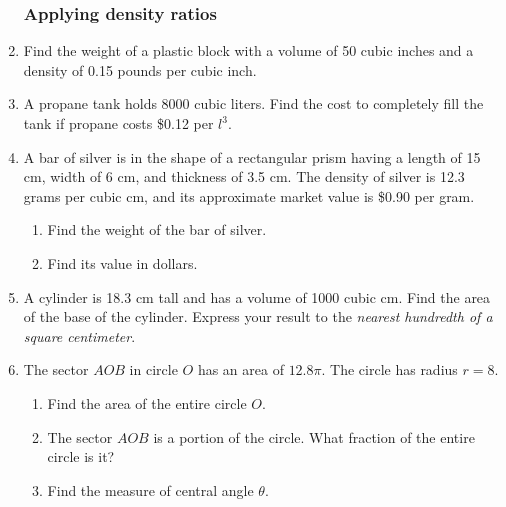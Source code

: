 \documentclass[12pt, twoside]{article}
\begin{document}
\begin{enumerate}
\subsubsection*{Applying density ratios}
\item Find the weight of a plastic block with a volume of 50 cubic inches and a density of 0.15 pounds per cubic inch. \vspace{3cm}
\item A propane tank holds 8000 cubic liters. Find the cost to completely fill the tank if propane costs \$0.12 per $l^3$. \vspace{2cm}
\item A bar of silver is in the shape of a rectangular prism having a length of 15 cm, width of 6 cm, and thickness of 3.5 cm. The density of silver is 12.3 grams per cubic cm, and its approximate market value is \$0.90 per gram.
  \begin{enumerate}
    \item Find the weight of the bar of silver.  \vspace{3cm}
    \item Find its value in dollars.
  \end{enumerate} \vspace{2cm}

\item A cylinder is 18.3 cm tall and has a volume of 1000 cubic cm. Find the area of the base of the cylinder. Express your result to the \emph{nearest hundredth of a square centimeter}. \vspace{3cm}


\newpage
\item The sector $AOB$ in circle $O$ has an area of $12.8\pi$. The circle has radius $r=8$.
      \begin{multicols}{2}
      \raggedcolumns
      \begin{enumerate}
        \item Find the area of the entire circle $O$. \vspace{2cm}
        \item The sector $AOB$ is a portion of the circle. What fraction of the entire circle is it? \vspace{1.5cm}
        \item Find the measure of central angle $\theta$.
      \end{enumerate}
      \end{multicols}  \vspace{3cm}


\end{enumerate}
\end{document}
